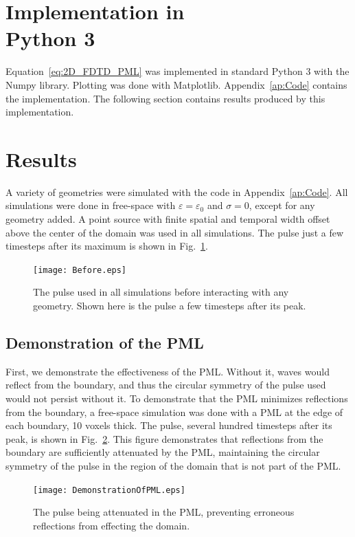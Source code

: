 \documentclass[12pt]{article}
\begin{document}
\begin{multicols}{2}
\section{Implementation in \\ Python 3}
Equation~\ref{eq:2D_FDTD_PML} was implemented in standard Python 3 with the Numpy library. Plotting was done with Matplotlib. Appendix~\ref{ap:Code} contains the implementation. The following section contains results produced by this implementation.
\section{Results}
A variety of geometries were simulated with the code in Appendix~\ref{ap:Code}. All simulations were done in free-space with $\varepsilon = \varepsilon_0$ and $\sigma=0$, except for any geometry added. A point source with finite spatial and temporal width offset above the center of the domain was used in all simulations. The pulse just a few timesteps after its maximum is shown in Fig.~\ref{fig:before}.
\begin{figure}[H]
\centering
\texttt{[image: Before.eps]}
\caption{The pulse used in all simulations before interacting with any geometry. Shown here is the pulse a few timesteps after its peak.}
\label{fig:before}
\end{figure}
\subsection{Demonstration of the PML}
First, we demonstrate the effectiveness of the PML. Without it, waves would reflect from the boundary, and thus the circular symmetry of the pulse used would not persist without it. To demonstrate that the PML minimizes reflections from the boundary, a free-space simulation was done with a PML at the edge of each boundary, 10 voxels thick. The pulse, several hundred timesteps after its peak, is shown in Fig.~\ref{fig:PMLsim}. This figure demonstrates that reflections from the boundary are sufficiently attenuated by the PML, maintaining the circular symmetry of the pulse in the region of the domain that is not part of the PML.
\begin{figure}[H]
\centering
\texttt{[image: DemonstrationOfPML.eps]}
\caption{The pulse being attenuated in the PML, preventing erroneous reflections from effecting the domain.}
\label{fig:PMLsim}
\end{figure}

\end{multicols}
\end{document}
